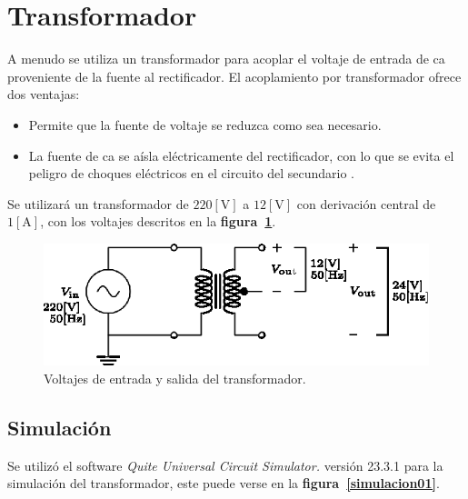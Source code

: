 \section{Transformador}
A menudo se utiliza un transformador para acoplar el voltaje de entrada de ca
proveniente de la fuente al rectificador. El acoplamiento por transformador
ofrece dos ventajas:

\begin{itemize}
    \item Permite que la fuente de voltaje se reduzca como sea necesario.
    \item La fuente de ca se aísla eléctricamente del rectificador, con lo que
        se evita el peligro de choques eléctricos en el circuito del
        secundario \cite{Floyd}.
\end{itemize}

Se utilizará un transformador de $220[\text{V}]$ a $12[\text{V}]$ con derivación
central de $1[\text{A}]$, con los voltajes descritos en la
\textbf{figura~\ref{circuito01}}.

\begin{figure}[!h]
\centering
\includegraphics[scale=1.1]{diagramas/01.transformador.eps}
\caption{Voltajes de entrada y salida del transformador.}
\label{circuito01}
\end{figure}

\subsection{Simulación}
Se utilizó el software \emph{Quite Universal Circuit Simulator.} versión 23.3.1
para la simulación del transformador, este puede verse en la
\textbf{figura~\ref{simulacion01}}.

